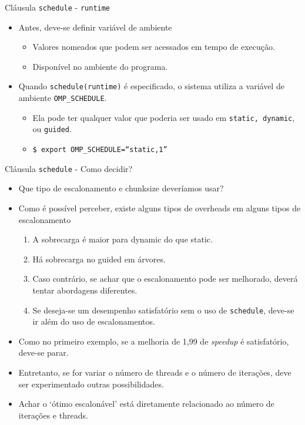 	\begin{frame}{Cláusula {\tt schedule} - {\tt runtime}}
		\begin{itemize}
			\setlength\itemsep{1.5em}
			\item Antes, deve-se definir variável de ambiente 
			\begin{itemize}
				\setlength\itemsep{0.8em}
				\item Valores nomeados que podem ser acessados em tempo de execução. 
				\item Disponível no ambiente do programa.
			\end{itemize}
			\item Quando {\tt schedule(runtime)} é especificado, o sistema utiliza a variável de ambiente {\tt OMP\_SCHEDULE}.
			\begin{itemize}
				\setlength\itemsep{0.8em}
				\item Ela pode ter qualquer valor que poderia ser usado em {\tt static, dynamic}, ou {\tt guided}.
				\item {\tt \$ export OMP\_SCHEDULE=``static,1''}
			\end{itemize}
		\end{itemize}
	\end{frame}

	\begin{frame}{Cláusula {\tt schedule} - Como decidir?}
		\begin{itemize}
			\item Que tipo de escalonamento e chunksize deveríamos usar?
					\bigskip
			\item Como é possível perceber, existe alguns tipos de overheads em alguns tipos de escalonamento
			\begin{enumerate}
				\item A sobrecarga é maior para dynamic do que static.
				\item Há sobrecarga no guided em árvores.
				\item Caso contrário, se achar que o escalonamento pode ser melhorado, deverá tentar abordagens diferentes.
				\item Se deseja-se um desempenho satisfatório sem o uso de {\tt schedule}, deve-se ir além do uso de escalonamentos.
			\end{enumerate}
						\bigskip
			\item Como no primeiro exemplo, se a melhoria de 1,99 de \textit{speedup} é satisfatório, deve-se parar.
			\item Entretanto, se for variar o número de threads e o número de iterações, deve ser experimentado outras possibilidades. 
			\item Achar o `ótimo escalonável' está diretamente relacionado ao número de iterações e threads.
		\end{itemize}
	\end{frame}


